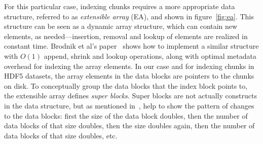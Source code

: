 \begin{figure*}
\centering

\caption{Simplified version of extensible array structure used for indexing chunks.}
\label{fig:ea}
\end{figure*}

For this particular case, indexing chunks requires a more appropriate data
structure, referred to as \textit{extensible array} (EA), and shown in
figure~\ref{fig:ea}. This structure can be seen as a dynamic array structure,
which can contain new elements, as needed---insertion, removal and lookup of
elements are realized in constant time.
Brodnik et al's paper~\cite{Brodnik1999} shows how to implement a similar
structure with $O(1)$ append, shrink and lookup
operations, along with optimal metadata overhead for indexing the array elements.
In our case and for indexing chunks in HDF5 datasets, the array elements in the
data blocks are pointers to the chunks on disk.
To conceptually group the data blocks that the index block points to,
the extensible array defines \textit{super blocks}.
Super blocks are not actually constructs in the data structure, but
as mentioned in~\cite{Brodnik1999}, help to show the pattern of
changes to the data blocks: first the size of the data block doubles, then the 
number of data blocks of that size doubles, then the size doubles again, then the 
number of data blocks of that size doubles, etc.

